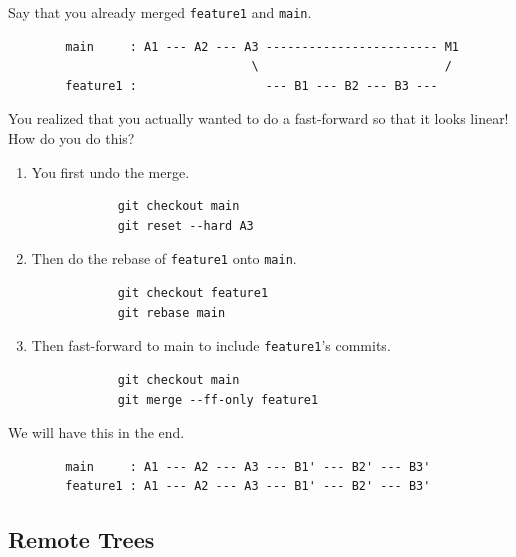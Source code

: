     \begin{example}
      \label{ex:converting-a-merge-into-rebase}
      Say that you already merged \texttt{feature1} and \texttt{main}. 
      \begin{lstlisting}
        main     : A1 --- A2 --- A3 ------------------------ M1
                                  \                          /
        feature1 :                  --- B1 --- B2 --- B3 ---  
      \end{lstlisting}
      You realized that you actually wanted to do a fast-forward so that it looks linear! How do you do this? 
      \begin{enumerate}
        \item You first undo the merge. 
          \begin{lstlisting}
            git checkout main 
            git reset --hard A3
          \end{lstlisting} 

        \item Then do the rebase of \texttt{feature1} onto \texttt{main}. 
          \begin{lstlisting}
            git checkout feature1 
            git rebase main 
          \end{lstlisting} 

        \item Then fast-forward to main to include \texttt{feature1}'s commits. 
          \begin{lstlisting}
            git checkout main 
            git merge --ff-only feature1
          \end{lstlisting}
      \end{enumerate}
      We will have this in the end. 
      \begin{lstlisting}
        main     : A1 --- A2 --- A3 --- B1' --- B2' --- B3' 
        feature1 : A1 --- A2 --- A3 --- B1' --- B2' --- B3'
      \end{lstlisting}
    \end{example} 

\subsection{Remote Trees}

